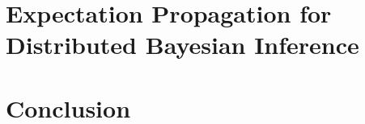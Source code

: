 \ifpbp\fi

\chapter[EP for Distributed Bayesian Inference]{Expectation Propagation for\\ Distributed Bayesian Inference}
\ifsnep\fi

\chapter{Conclusion}




\appendix{}




\newpage
\renewcommand{\bibname}{References}

\begin{footnotesize}

\end{footnotesize}

